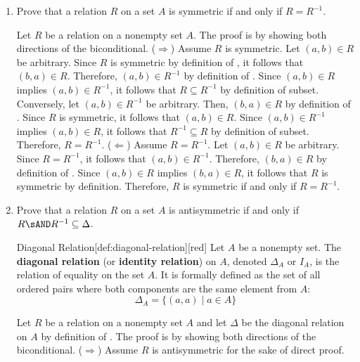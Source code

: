 \begin{enumerate}
  
  \begin{enumerate}
    \item Prove that a relation $R$ on a set $A$ is symmetric if and only if $R=R^{-1}$.
      \begin{subprove}
        Let $R$ be a relation on a nonempty set $A$. 
        The proof is by showing both directions of the biconditional.
        \proofstep
        ($\Rightarrow$) Assume $R$ is symmetric. Let $(a,b) \in R$ be arbitrary. 
        Since $R$ is symmetric by definition of , it follows that $(b,a) \in R$. 
        Therefore, $(a,b) \in R^{-1}$ by definition of . 
        Since $(a,b) \in R$ implies $(a,b) \in R^{-1}$, it follows that $R \subseteq R^{-1}$ by definition of subset.
        Conversely, let $(a,b) \in R^{-1}$ be arbitrary. Then, $(b,a) \in R$ by definition of . 
        Since $R$ is symmetric, it follows that $(a,b) \in R$. 
        Since $(a,b) \in R^{-1}$ implies $(a,b) \in R$, it follows that $R^{-1} \subseteq R$ by definition of subset.
        Therefore, $R = R^{-1}$.
        \proofstep
        ($\Leftarrow$) Assume $R = R^{-1}$. Let $(a,b) \in R$ be arbitrary. 
        Since $R = R^{-1}$, it follows that $(a,b) \in R^{-1}$. 
        Therefore, $(b,a) \in R$ by definition of . 
        Since $(a,b) \in R$ implies $(b,a) \in R$, it follows that $R$ is symmetric by definition.
        \proofstep
        Therefore, $R$ is symmetric if and only if $R = R^{-1}$.
      \end{subprove}
    \item Prove that a relation $R$ on a set $A$ is antisymmetric if and only if $R \sAND R^{-1} \subseteq \Delta$.
    \begin{define}{Diagonal Relation}[def:diagonal-relation][red]
      Let $A$ be a nonempty set. The \textbf{diagonal relation} (or \textbf{identity relation}) on $A$, denoted $\Delta_A$ or $I_A$, is the relation of equality on the set $A$. It is formally defined as the set of all ordered pairs where both components are the same element from $A$:
      $$ \Delta_A = \{ (a,a) \mid a \in A \} $$
    \end{define}
      \begin{subprove}
        Let $R$ be a relation on a nonempty set $A$ and let $\Delta$ be the diagonal relation on $A$ by definition of .
        The proof is by showing both directions of the biconditional.
        \proofstep
        ($\Rightarrow$) Assume $R$ is antisymmetric for the sake of direct proof. 

\end{subprove}
\end{enumerate}
\end{enumerate}
